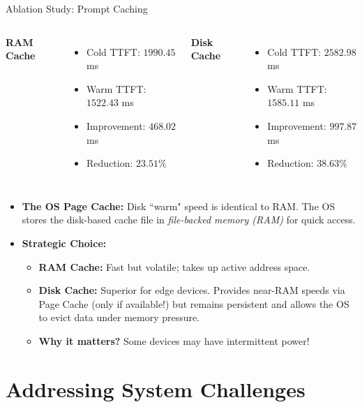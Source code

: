 \documentclass[10pt]{beamer}
\begin{document}
\begin{frame}{Ablation Study: Prompt Caching}
    \begin{columns}
    \textbf{RAM Cache}
    \begin{itemize}
        \item Cold TTFT: $1990.45$ ms
        \item Warm TTFT: $1522.43$ ms
        \item Improvement: $468.02$ ms
        \item Reduction: $23.51\%$
    \end{itemize}
    \textbf{Disk Cache}
    \begin{itemize}
        \item Cold TTFT: $2582.98$ ms
        \item Warm TTFT: $1585.11$ ms
        \item Improvement: $997.87$ ms
        \item Reduction: $38.63\%$
    \end{itemize}
    \end{columns}
    
    \begin{itemize}
        \item \textbf{The OS Page Cache:} Disk ``warm" speed is identical to RAM. The OS stores the disk-based cache file in \textit{file-backed memory (RAM)} for quick access.
        \item \textbf{Strategic Choice:} 
        \begin{itemize}
            \item \textbf{RAM Cache:} Fast but volatile; takes up active address space.
            \item \textbf{Disk Cache:} Superior for edge devices. Provides near-RAM speeds via Page Cache (only if available!) but remains persistent and allows the OS to evict data under memory pressure.
            \item \textbf{Why it matters?} Some devices may have intermittent power!
        \end{itemize}
    \end{itemize}
\end{frame}

\section{Addressing System Challenges}
\end{document}
